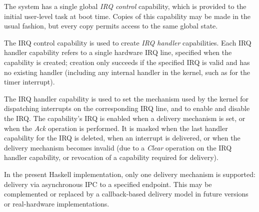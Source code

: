 The system has a single global \emph{IRQ control} capability, which is provided 
to the initial user-level task at boot time. Copies of this capability may be
made in the usual fashion, but every copy permits access to the same global
state.

The IRQ control capability is used to create \emph{IRQ handler} capabilities.
Each IRQ handler capability refers to a single hardware IRQ line, specified when 
the capability is created; creation only succeeds if the specified IRQ is valid
and has no existing handler (including any internal handler in the kernel, such
as for the timer interrupt).

The IRQ handler capability is used to set the mechanism used by the kernel for 
dispatching interrupts on the corresponding IRQ line, and to enable and disable 
the IRQ. The capability's IRQ is enabled when a delivery mechanism is set, or
when the \emph{Ack} operation is performed. It is masked when the last handler
capability for the IRQ is deleted, when an interrupt is delivered, or when the
delivery mechanism becomes invalid (due to a \emph{Clear} operation on the IRQ
handler capability, or revocation of a capability required for delivery).

In the present Haskell implementation, only one delivery mechanism is supported: 
delivery via asynchronous IPC to a specified endpoint. This may be complemented
or replaced by a callback-based delivery model in future versions or
real-hardware implementations.

